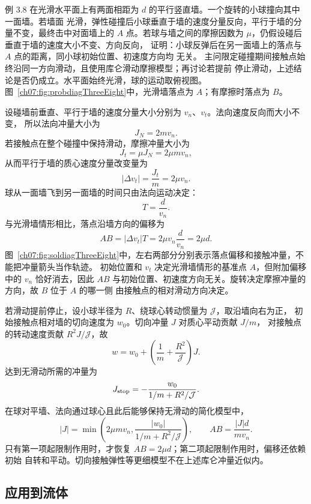 \Needspace{0.38\textheight}
\begin{origexamplebox}{例 3.8}
在光滑水平面上有两面相距为 $d$ 的平行竖直墙。一个旋转的小球撞向其中一面墙。若墙面
光滑，弹性碰撞后小球垂直于墙的速度分量反向，平行于墙的分量不变，最终击中对面墙上的
$A$ 点。若球与墙之间的摩擦因数为 $\mu$，仍假设碰后垂直于墙的速度大小不变、方向反向，
证明：小球反弹后在另一面墙上的落点与 $A$ 点的距离，同小球初始位置、初速度方向均
无关。
主问限定碰撞期间接触点始终沿同一方向滑动，且使用库仑滑动摩擦模型；再讨论若提前
停止滑动，上述结论是否仍成立。水平面始终光滑，球的运动取俯视图。
图~\ref{ch07:fig:probdiagThreeEight}中，光滑墙落点为 $A$；有摩擦时落点为 $B$。
\probdiagThreeEight
\end{origexamplebox}

\begin{xesolution}
设碰墙前垂直、平行于墙的速度分量大小分别为 $v_n$、$v_t$。法向速度反向而大小不变，
所以法向冲量大小为
\[
 J_N=2mv_n.
\]
若接触点在整个碰撞中保持滑动，摩擦冲量大小为
\[
 J_t=\mu J_N=2\mu mv_n,
\]
从而平行于墙的质心速度分量改变量为
\[
 |\Delta v_t|=\frac{J_t}{m}=2\mu v_n.
\]
球从一面墙飞到另一面墙的时间只由法向运动决定：
\[
 T=\frac{d}{v_n}.
\]
与光滑墙情形相比，落点沿墙方向的偏移为
\[
 AB=|\Delta v_t|T=2\mu v_n\frac{d}{v_n}
 =\boxed{2\mu d}.
\]
图~\ref{ch07:fig:soldiagThreeEight}中，左右两部分分别表示落点偏移和接触冲量，不能把冲量箭头当作轨迹。
\soldiagThreeEight
初始位置和 $v_t$ 决定光滑墙情形的基准点 $A$，但附加偏移中的 $v_n$ 恰好消去，因此
$AB$ 与初始位置、初速度方向无关。旋转决定摩擦冲量的方向，故 $B$ 位于 $A$ 的哪一侧
由接触点的相对滑动方向决定。

若滑动提前停止，设小球半径为 $R$、绕球心转动惯量为 $\mathcal J$，取沿墙向右为正，
初始接触点相对墙的切向速度为 $w_0$。切向冲量 $J$ 对质心平动贡献 $J/m$，
对接触点的转动速度贡献 $R^2J/\mathcal J$，故
\[
 w=w_0+\left(\frac1m+\frac{R^2}{\mathcal J}\right)J.
\]
达到无滑动所需的冲量为
\[
 J_{\rm stop}=-\frac{w_0}{1/m+R^2/\mathcal J}.
\]
在球对平墙、法向通过球心且此后能够保持无滑动的简化模型中，
\[
 |J|=\min\left(2\mu m v_n,\frac{|w_0|}{1/m+R^2/\mathcal J}\right),
 \qquad AB=\frac{|J|d}{mv_n}.
\]
只有第一项起限制作用时，才恢复 $AB=2\mu d$；第二项起限制作用时，偏移还依赖初始
自转和平动。切向接触弹性等更细模型不在上述库仑冲量近似内。
\end{xesolution}

\subsection{应用到流体}

